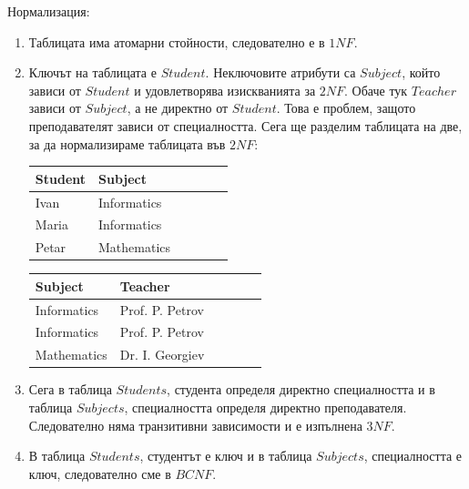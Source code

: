 \documentclass{article}
\begin{document}
Нормализация:
\begin{enumerate}
    \item Таблицата има атомарни стойности, следователно е в $1NF$.
    \item Ключът на таблицата е $Student$. Неключовите атрибути са $Subject$, който зависи от $Student$ и удовлетворява изискванията за $2NF$.
    Обаче тук $Teacher$ зависи от $Subject$, а не директно от $Student$. Това е проблем, защото преподавателят зависи от специалността. Сега ще разделим
    таблицата на две, за да нормализираме таблицата във $2NF$:
    \begin{center}
        \begin{tabularx}{0.7\textwidth}{ 
            | >{\centering\arraybackslash}X 
            | >{\centering\arraybackslash}X 
            | >{\centering\arraybackslash}X 
            | >{\centering\arraybackslash}X
            | >{\centering\arraybackslash}X
            | >{\centering\arraybackslash}X |}
        \hline
        \textbf{Student} & \textbf{Subject} \\
        \hline
        Ivan & Informatics \\
        \hline
        Maria & Informatics \\
        \hline
        Petar & Mathematics \\
        \hline
        \end{tabularx}
        \newline\newline\newline
        \begin{tabularx}{0.7\textwidth}{ 
            | >{\centering\arraybackslash}X 
            | >{\centering\arraybackslash}X 
            | >{\centering\arraybackslash}X 
            | >{\centering\arraybackslash}X
            | >{\centering\arraybackslash}X
            | >{\centering\arraybackslash}X |}
        \hline
        \textbf{Subject} & \textbf{Teacher} \\
        \hline
        Informatics & Prof. P. Petrov \\
        \hline
        Informatics & Prof. P. Petrov \\
        \hline
        Mathematics & Dr. I. Georgiev \\
        \hline
        \end{tabularx}
    \end{center}
    \item Сега в таблица $Students$, студента определя директно специалността и в таблица $Subjects$, специалността определя директно преподавателя.
    Следователно няма транзитивни зависимости и е изпълнена $3NF$.
    \item В таблица $Students$, студентът е ключ и в таблица $Subjects$, специалността е ключ, следователно сме в $BCNF$.
\end{enumerate}
\end{document}
